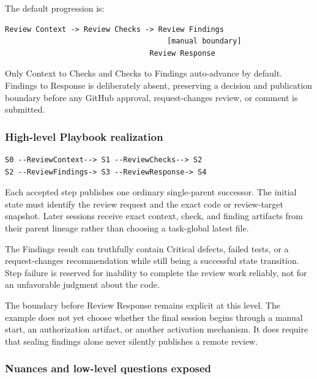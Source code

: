 \documentclass[11pt]{article}
\begin{document}
The default progression is:

\begin{lstlisting}[style=playbook]
Review Context -> Review Checks -> Review Findings
                                     [manual boundary]
                                 Review Response
\end{lstlisting}

Only Context to Checks and Checks to Findings auto-advance by default. Findings to Response is deliberately absent, preserving a decision and publication boundary before any GitHub approval, request-changes review, or comment is submitted.

\subsubsection{High-level Playbook realization}

\begin{lstlisting}[style=playbook]
S0 --ReviewContext--> S1 --ReviewChecks--> S2
S2 --ReviewFindings-> S3 --ReviewResponse-> S4
\end{lstlisting}

Each accepted step publishes one ordinary single-parent successor. The initial state must identify the review request and the exact code or review-target snapshot. Later sessions receive exact context, check, and finding artifacts from their parent lineage rather than choosing a task-global latest file.

The Findings result can truthfully contain Critical defects, failed tests, or a request-changes recommendation while still being a successful state transition. Step failure is reserved for inability to complete the review work reliably, not for an unfavorable judgment about the code.

The boundary before Review Response remains explicit at this level. The example does not yet choose whether the final session begins through a manual start, an authorization artifact, or another activation mechanism. It does require that sealing findings alone never silently publishes a remote review.

\subsubsection{Nuances and low-level questions exposed}
\end{document}
